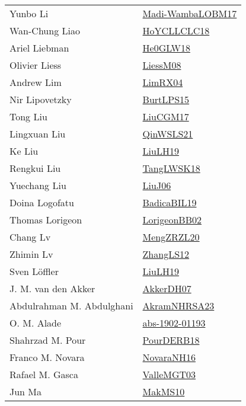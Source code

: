 {\begin{longtable}{p{4cm}p{20cm}}
Yunbo Li & \href{papers/Madi-WambaLOBM17.pdf}{Madi-WambaLOBM17}\cite{Madi-WambaLOBM17} \\
Wan{-}Chung Liao & \href{papers/HoYCLLCLC18.pdf}{HoYCLLCLC18}\cite{HoYCLLCLC18} \\
Ariel Liebman & \href{papers/He0GLW18.pdf}{He0GLW18}\cite{He0GLW18} \\
Olivier Liess & \href{articles/LiessM08.pdf}{LiessM08}\cite{LiessM08} \\
Andrew Lim & \href{papers/LimRX04.pdf}{LimRX04}\cite{LimRX04} \\
Nir Lipovetzky & \href{papers/BurtLPS15.pdf}{BurtLPS15}\cite{BurtLPS15} \\
Tong Liu & \href{papers/LiuCGM17.pdf}{LiuCGM17}\cite{LiuCGM17} \\
Lingxuan Liu & \href{articles/QinWSLS21.pdf}{QinWSLS21}\cite{QinWSLS21} \\
Ke Liu & \href{papers/LiuLH19.pdf}{LiuLH19}\cite{LiuLH19} \\
Rengkui Liu & \href{articles/TangLWSK18.pdf}{TangLWSK18}\cite{TangLWSK18} \\
Yuechang Liu & \href{papers/LiuJ06.pdf}{LiuJ06}\cite{LiuJ06} \\
Doina Logofatu & \href{papers/BadicaBIL19.pdf}{BadicaBIL19}\cite{BadicaBIL19} \\
Thomas Lorigeon & \href{articles/LorigeonBB02.pdf}{LorigeonBB02}\cite{LorigeonBB02} \\
Chang Lv & \href{articles/MengZRZL20.pdf}{MengZRZL20}\cite{MengZRZL20} \\
Zhimin Lv & \href{papers/ZhangLS12.pdf}{ZhangLS12}\cite{ZhangLS12} \\
Sven L{\"{o}}ffler & \href{papers/LiuLH19.pdf}{LiuLH19}\cite{LiuLH19} \\
J. M. van den Akker & \href{papers/AkkerDH07.pdf}{AkkerDH07}\cite{AkkerDH07} \\
Abdulrahman M. Abdulghani & \href{articles/AkramNHRSA23.pdf}{AkramNHRSA23}\cite{AkramNHRSA23} \\
O. M. Alade & \href{articles/abs-1902-01193.pdf}{abs-1902-01193}\cite{abs-1902-01193} \\
Shahrzad M. Pour & \href{articles/PourDERB18.pdf}{PourDERB18}\cite{PourDERB18} \\
Franco M. Novara & \href{articles/NovaraNH16.pdf}{NovaraNH16}\cite{NovaraNH16} \\
Rafael M. Gasca & \href{papers/ValleMGT03.pdf}{ValleMGT03}\cite{ValleMGT03} \\
Jun Ma & \href{papers/MakMS10.pdf}{MakMS10}\cite{MakMS10} \\

\end{longtable}}

